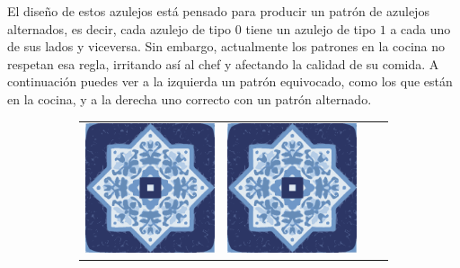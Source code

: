 \documentclass{oci}
\begin{document}
\begin{problemDescription}
El diseño de estos azulejos está pensado para producir un patrón de azulejos
alternados, es decir, cada azulejo de tipo $0$ tiene un azulejo de tipo $1$
a cada uno de sus lados y viceversa.
Sin embargo, actualmente los patrones en la cocina no respetan esa regla,
irritando así al chef y afectando la calidad de su comida.
A continuación puedes ver a la izquierda un patrón equivocado, como los que están
en la cocina, y a la derecha uno correcto con un patrón alternado.

\begin{figure}[h]
\setlength{\tabcolsep}{0.5pt}
\begin{subfigure}{0.45\textwidth}
  \begin{center}
    {
      \renewcommand{\arraystretch}{0.25}
      \begin{tabular}{cccc}
        \includegraphics[scale=0.3]{a.eps} &
        \includegraphics[scale=0.3]{a.eps} &

\end{tabular}}
\end{center}
\end{subfigure}
\end{figure}
\end{problemDescription}
\end{document}
